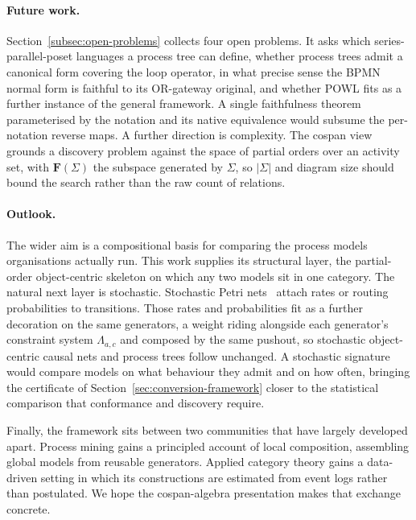 \paragraph{Future work.}
Section~\ref{subsec:open-problems} collects four open problems. It asks which
series-parallel-poset languages a process tree can define, whether process trees admit a canonical
form covering the loop operator, in what precise sense the BPMN normal form is faithful to its
OR-gateway original, and whether POWL fits as a further instance of the general framework. A single faithfulness theorem parameterised by the notation and
its native equivalence would subsume the per-notation reverse maps. A further direction is
complexity. The cospan view grounds a discovery problem against the space of partial orders over an
activity set, with $\mathbf{F}(\Sigma)$ the subspace generated by $\Sigma$, so $|\Sigma|$ and diagram size
should bound the search rather than the raw count of relations.

\paragraph{Outlook.}
The wider aim is a compositional basis for comparing the process models organisations actually run.
This work supplies its structural layer, the partial-order object-centric skeleton on which any two
models sit in one category. The natural next layer is stochastic.
Stochastic Petri nets~\cite{baezQuantumTechniquesStochastic2018} attach rates or routing
probabilities to transitions. Those rates and probabilities fit as a further decoration on the same generators, a weight
riding alongside each generator's constraint system $\Lambda_{a,c}$ and composed by the same pushout, so stochastic object-centric causal
nets and process trees follow unchanged. A stochastic signature would compare models on
what behaviour they admit and on how often, bringing the certificate of
Section~\ref{sec:conversion-framework} closer to the statistical comparison that conformance and
discovery require.

Finally, the framework sits between two communities that have largely developed apart. Process
mining gains a principled account of local composition, assembling global models from reusable
generators. Applied category theory gains a data-driven setting in which its constructions are
estimated from event logs rather than postulated. We hope the cospan-algebra presentation makes that
exchange concrete.
